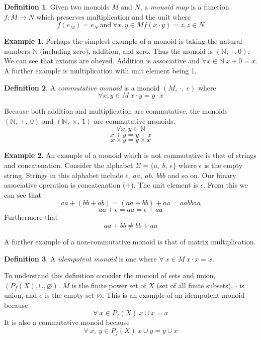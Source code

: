 \documentclass{article}
\theoremstyle{definition}
\newtheorem{definition}{Definition}[section]
\newtheorem{example}{Example}[section]
\begin{document}
\begin{definition}
	Given two monoids $M$ and $N$, a \textit{monoid map} is a function $f : M \rightarrow N$
	which preserves multiplication and the unit where
	$$f(e_M) = e_N\ \textrm{and}\ \forall x, y \in M f(x \cdot y) = z, z \in N$$
\end{definition}

\begin{example}
	Perhaps the simplest example of a monoid is taking the natural numbers $\mathbb{N}$
	(including zero), addition, and zero.
	Thus the monoid is $(\mathbb{N}, +, 0)$. We can see that axioms
	are obeyed. Addition is associative and $\forall x \in \mathbb{N}\ x + 0 = x$.
	A further example is multiplication with unit element being 1.
\end{example}

\begin{definition}
	A \textit{commutative monoid} is a monoid $(M,\ \cdot,\ e)$ where
	$$\forall x, y \in M\ x \cdot y = y \cdot x$$
\end{definition}

Because both addition and multiplication are commutative, the monoids $(\mathbb{N},\ +,\ 0)$
and $(\mathbb{N},\ \times,\ 1)$ are commutative monoids.
$$ \forall x, y \in \mathbb{N}$$
$$x + y = y + x$$
$$x \times y = y \times x$$

\begin{example}
	An example of a monoid which is not commutative is that of strings and concatenation.
	Consider the alphabet $\Sigma = \{a,\ b,\ \epsilon\}$ where $\epsilon$ is the empty string.
	Strings in this alphabet include $\epsilon,\ aa,\ ab,\ bbb$ and so on.
	Our binary associative operation is concatenation ($+$).
	The unit element is $\epsilon$.
	From this we can see that
	$$aa + (bb + ab) = (aa + bb) + aa = aabbaa$$
	$$aa + \epsilon = aa = \epsilon + aa$$
	Furthermore that
	$$aa + bb \ne bb + aa$$
\end{example}

A further example of a non-commutative monoid is that of matrix multiplication.

\begin{definition}
	A \textit{idempotent monoid} is one where $\forall\ x \in M\ x \cdot x = x$.
\end{definition}

To understand this definition consider the monoid of sets and union, $(P_f(X), \cup, \varnothing)$.
$M$ is the finite power set of $X$ (set of all finite subsets), $\cdot$ is union, and $e$ is
the empty set $\varnothing$.
This is an example of an idempotent monoid because
$$\forall\ x \in P_f(X)\ x \cup x = x$$
It is also a commutative monoid because
$$\forall\ x,\ y \in P_f(X)\ x \cup y = y \cup x$$
\end{document}
